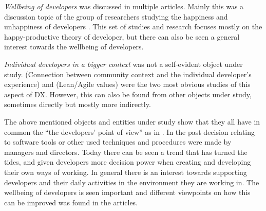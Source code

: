 \documentclass[english, 12pt, a4paper, sci, utf8, a-1b, online]{aaltothesis}
\begin{document}
\textit{Wellbeing of developers} was discussed in multiple articles. Mainly this was a discussion topic of the group of researchers studying the happiness and unhappiness of developers \parencite{what-happens-when-unhappy, unhappy-developers, consequences-of-unhappiness, on-the-unhappiness}. This set of studies and research focuses mostly on the happy-productive theory of developer, but there can also be seen a general interest towards the wellbeing of developers.

\textit{Individual developers in a bigger context} was not a self-evident object under study. \textcite{entering-an-ecosystem} (Connection between community context and the individual developer's experience) and \textcite{fagerholm2014examining} (Lean/Agile values) were the two most obvious studies of this aspect of DX. However, this can also be found from other objects under study, sometimes directly but mostly more indirectly.

The above mentioned objects and entities under study show that they all have in common the ``the developers' point of view'' as in \textcite{voice-of-the-developer}. In the past decision relating to software tools or other used techniques and procedures were made by managers and directors. Today there can be seen a trend that has turned the tides, and given developers more decision power when creating and developing their own ways of working. In general there is an interest towards supporting developers and their daily activities in the environment they are working in. The wellbeing of developers is seen important and different viewpoints on how this can be improved was found in the articles.
\end{document}
